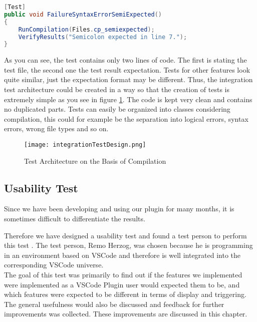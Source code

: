 \begin{lstlisting}[language=csharp, caption={Sample Test for Missing Semicolon}, captionpos=b, label={lst:demoTest}]
[Test]
public void FailureSyntaxErrorSemiExpected()
{
    RunCompilation(Files.cp_semiexpected);
    VerifyResults("Semicolon expected in line 7.");
}
\end{lstlisting}


As you can see, the test contains only two lines of code.
The first is stating the test file, the second one the test result expectation.
Tests for other features look quite similar, just the expectation format may be different.
Thus, the integration test architecture could be created in a way so that the creation of tests is extremely simple
as you see in figure \ref{fig:testArchitecture}.
The code is kept very clean and contains no duplicated parts.
Tests can easily be organized into classes \textendash{} considering compilation, this could for example be the separation into logical errors, syntax errors, wrong file types and so on.

\begin{figure}[H]
    \centering
    \texttt{[image: integrationTestDesign.png]}
    \caption{Test Architecture on the Basis of Compilation}
    \label{fig:testArchitecture}
\end{figure}


\subsection{Usability Test}
Since we have been developing and using our plugin for many months,
it is sometimes difficult to differentiate the results.

Therefore we have designed a usability test and found a test person to perform this test \cite{interview-remo}.
The test person, Remo Herzog, was chosen because he is programming in an environment based on VSCode
and therefore is well integrated into the corresponding VSCode universe. \\

The goal of this test was primarily to find out if the features
we implemented were implemented as a VSCode Plugin user would expected them to be,
and which features were expected to be different in terms of display and triggering. \\

The general usefulness would also be discussed and feedback for further improvements was collected.
These improvements are discussed in this chapter.


